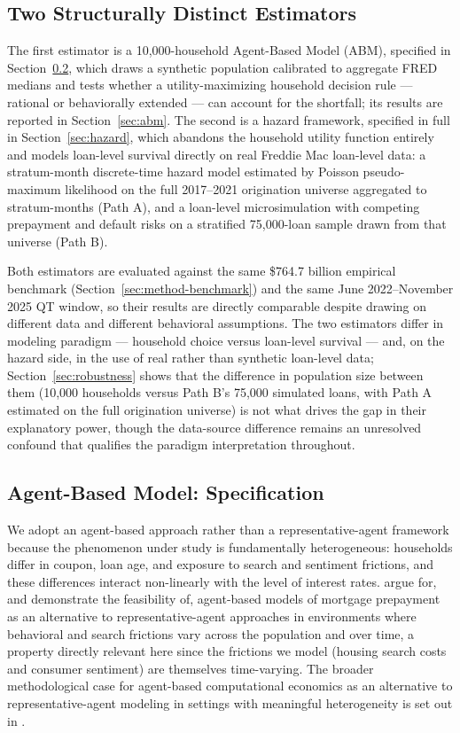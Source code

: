 \documentclass[12pt]{article}
\begin{document}
\subsection{Two Structurally Distinct Estimators}\label{sec:method-estimators}

The first estimator is a 10,000-household Agent-Based Model (ABM), specified in Section~\ref{sec:method-abm}, which draws a synthetic population calibrated to aggregate FRED medians and tests whether a utility-maximizing household decision rule --- rational or behaviorally extended --- can account for the shortfall; its results are reported in Section~\ref{sec:abm}. The second is a hazard framework, specified in full in Section~\ref{sec:hazard}, which abandons the household utility function entirely and models loan-level survival directly on real Freddie Mac loan-level data: a stratum-month discrete-time hazard model estimated by Poisson pseudo-maximum likelihood on the full 2017--2021 origination universe aggregated to stratum-months (Path A), and a loan-level microsimulation with competing prepayment and default risks on a stratified 75,000-loan sample drawn from that universe (Path B).

Both estimators are evaluated against the same \$764.7 billion empirical benchmark (Section~\ref{sec:method-benchmark}) and the same June 2022--November 2025 QT window, so their results are directly comparable despite drawing on different data and different behavioral assumptions. The two estimators differ in modeling paradigm --- household choice versus loan-level survival --- and, on the hazard side, in the use of real rather than synthetic loan-level data; Section~\ref{sec:robustness} shows that the difference in population size between them (10,000 households versus Path B's 75,000 simulated loans, with Path A estimated on the full origination universe) is not what drives the gap in their explanatory power, though the data-source difference remains an unresolved confound that qualifies the paradigm interpretation throughout.

\subsection{Agent-Based Model: Specification}\label{sec:method-abm}

We adopt an agent-based approach rather than a representative-agent framework because the phenomenon under study is fundamentally heterogeneous: households differ in coupon, loan age, and exposure to search and sentiment frictions, and these differences interact non-linearly with the level of interest rates. \citet{geanakoplos2012} argue for, and demonstrate the feasibility of, agent-based models of mortgage prepayment as an alternative to representative-agent approaches in environments where behavioral and search frictions vary across the population and over time, a property directly relevant here since the frictions we model (housing search costs and consumer sentiment) are themselves time-varying. The broader methodological case for agent-based computational economics as an alternative to representative-agent modeling in settings with meaningful heterogeneity is set out in \citet{tesfatsion2006}.
\end{document}
